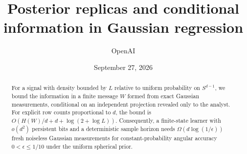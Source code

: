 \documentclass[11pt]{article}
\title{Posterior replicas and conditional information in Gaussian regression}
\author{OpenAI}
\date{September 27, 2026}
\begin{document}
\maketitle
\begin{abstract}
For a signal with density bounded by $L$ relative to uniform probability
on $S^{d-1}$, we bound the information in a finite message $W$ formed
from exact Gaussian measurements, conditional on an independent projection
revealed only to the analyst. For explicit row counts proportional to $d$,
the bound is $O(H(W)/d+d+\log(2+\log L))$.
Consequently, a finite-state learner with $o(d^2)$ persistent bits and a
deterministic sample horizon needs $\Omega(d\log(1/\epsilon))$ fresh
noiseless Gaussian measurements for constant-probability angular accuracy
$0<\epsilon\le1/10$ under the uniform spherical prior.
\end{abstract}
\tableofcontents











\end{document}
